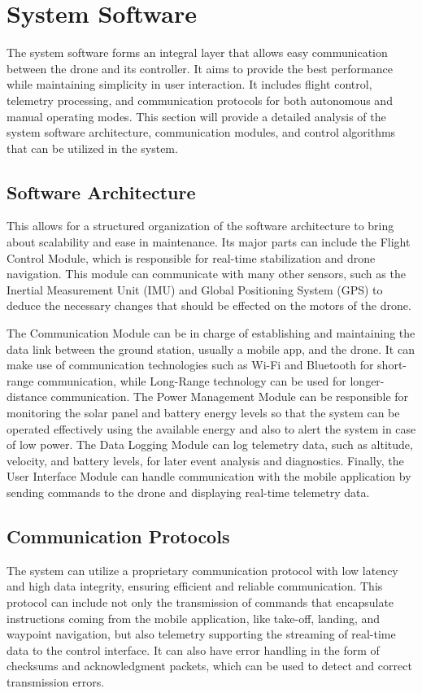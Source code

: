 \section{System Software}

The system software forms an integral layer that allows easy communication between the drone and its controller. It aims to provide the best performance while maintaining simplicity in user interaction. It includes flight control, telemetry processing, and communication protocols for both autonomous and manual operating modes. This section will provide a detailed analysis of the system software architecture, communication modules, and control algorithms that can be utilized in the system.

\subsection{Software Architecture}

This allows for a structured organization of the software architecture to bring about scalability and ease in maintenance. Its major parts can include the Flight Control Module, which is responsible for real-time stabilization and drone navigation. This module can communicate with many other sensors, such as the Inertial Measurement Unit (IMU) and Global Positioning System (GPS) to deduce the necessary changes that should be effected on the motors of the drone.

The Communication Module can be in charge of establishing and maintaining the data link between the ground station, usually a mobile app, and the drone. It can make use of communication technologies such as Wi-Fi and Bluetooth for short-range communication, while Long-Range technology can be used for longer-distance communication. The Power Management Module can be responsible for monitoring the solar panel and battery energy levels so that the system can be operated effectively using the available energy and also to alert the system in case of low power. The Data Logging Module can log telemetry data, such as altitude, velocity, and battery levels, for later event analysis and diagnostics. Finally, the User Interface Module can handle communication with the mobile application by sending commands to the drone and displaying real-time telemetry data.

\subsection{Communication Protocols} 
The system can utilize a proprietary communication protocol with low latency and high data integrity, ensuring efficient and reliable communication. This protocol can include not only the transmission of commands that encapsulate instructions coming from the mobile application, like take-off, landing, and waypoint navigation, but also telemetry supporting the streaming of real-time data to the control interface. It can also have error handling in the form of checksums and acknowledgment packets, which can be used to detect and correct transmission errors.


